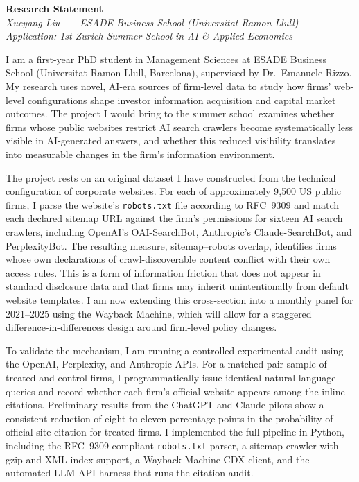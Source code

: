 \documentclass[11pt]{article}
\begin{document}
\begin{center}
  {\Large \textbf{Research Statement}} \\[3pt]
  \textit{Xueyang Liu \,---\, ESADE Business School (Universitat Ramon Llull)} \\
  \textit{Application: 1st Zurich Summer School in AI \& Applied Economics}
\end{center}

\vspace{4pt}

I am a first-year PhD student in Management Sciences at ESADE Business School
(Universitat Ramon Llull, Barcelona), supervised by Dr.\ Emanuele Rizzo. My
research uses novel, AI-era sources of firm-level data to study how firms'
web-level configurations shape investor information acquisition and capital
market outcomes. The project I would bring to the summer school examines
whether firms whose public websites restrict AI search crawlers become
systematically less visible in AI-generated answers, and whether this reduced
visibility translates into measurable changes in the firm's information
environment.

The project rests on an original dataset I have constructed from the technical
configuration of corporate websites. For each of approximately 9{,}500 US
public firms, I parse the website's \texttt{robots.txt} file according to
RFC~9309 and match each declared sitemap URL against the firm's permissions
for sixteen AI search crawlers, including OpenAI's OAI-SearchBot, Anthropic's
Claude-SearchBot, and PerplexityBot. The resulting measure, sitemap--robots
overlap, identifies firms whose own declarations of crawl-discoverable content
conflict with their own access rules. This is a form of information friction
that does not appear in standard disclosure data and that firms may inherit
unintentionally from default website templates. I am now extending this
cross-section into a monthly panel for 2021--2025 using the Wayback Machine,
which will allow for a staggered difference-in-differences design around
firm-level policy changes.

To validate the mechanism, I am running a controlled experimental audit using
the OpenAI, Perplexity, and Anthropic APIs. For a matched-pair sample of
treated and control firms, I programmatically issue identical natural-language
queries and record whether each firm's official website appears among the
inline citations. Preliminary results from the ChatGPT and Claude pilots show
a consistent reduction of eight to eleven percentage points in the probability
of official-site citation for treated firms. I implemented the full pipeline
in Python, including the RFC~9309-compliant \texttt{robots.txt} parser, a
sitemap crawler with gzip and XML-index support, a Wayback Machine CDX
client, and the automated LLM-API harness that runs the citation audit.
\end{document}
